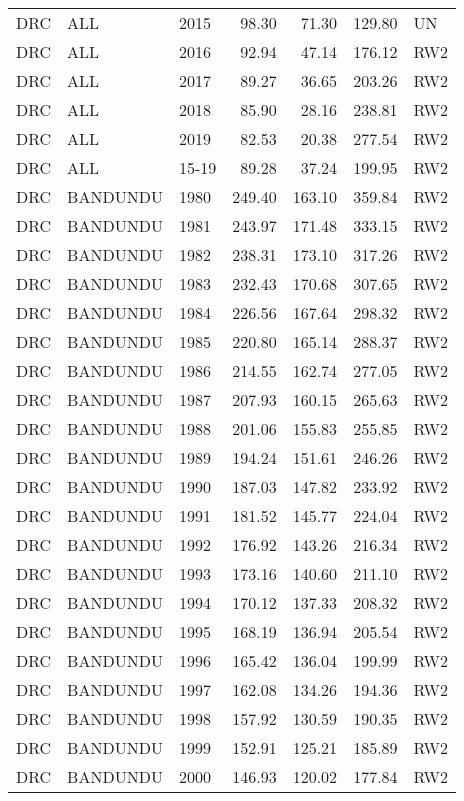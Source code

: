 \begin{longtable}{lllrrrl}
  DRC & ALL & 2015 & 98.30 & 71.30 & 129.80 & UN \\ 
  DRC & ALL & 2016 & 92.94 & 47.14 & 176.12 & RW2 \\ 
  DRC & ALL & 2017 & 89.27 & 36.65 & 203.26 & RW2 \\ 
  DRC & ALL & 2018 & 85.90 & 28.16 & 238.81 & RW2 \\ 
  DRC & ALL & 2019 & 82.53 & 20.38 & 277.54 & RW2 \\ 
  DRC & ALL & 15-19 & 89.28 & 37.24 & 199.95 & RW2 \\ 
  DRC & BANDUNDU & 1980 & 249.40 & 163.10 & 359.84 & RW2 \\ 
  DRC & BANDUNDU & 1981 & 243.97 & 171.48 & 333.15 & RW2 \\ 
  DRC & BANDUNDU & 1982 & 238.31 & 173.10 & 317.26 & RW2 \\ 
  DRC & BANDUNDU & 1983 & 232.43 & 170.68 & 307.65 & RW2 \\ 
  DRC & BANDUNDU & 1984 & 226.56 & 167.64 & 298.32 & RW2 \\ 
  DRC & BANDUNDU & 1985 & 220.80 & 165.14 & 288.37 & RW2 \\ 
  DRC & BANDUNDU & 1986 & 214.55 & 162.74 & 277.05 & RW2 \\ 
  DRC & BANDUNDU & 1987 & 207.93 & 160.15 & 265.63 & RW2 \\ 
  DRC & BANDUNDU & 1988 & 201.06 & 155.83 & 255.85 & RW2 \\ 
  DRC & BANDUNDU & 1989 & 194.24 & 151.61 & 246.26 & RW2 \\ 
  DRC & BANDUNDU & 1990 & 187.03 & 147.82 & 233.92 & RW2 \\ 
  DRC & BANDUNDU & 1991 & 181.52 & 145.77 & 224.04 & RW2 \\ 
  DRC & BANDUNDU & 1992 & 176.92 & 143.26 & 216.34 & RW2 \\ 
  DRC & BANDUNDU & 1993 & 173.16 & 140.60 & 211.10 & RW2 \\ 
  DRC & BANDUNDU & 1994 & 170.12 & 137.33 & 208.32 & RW2 \\ 
  DRC & BANDUNDU & 1995 & 168.19 & 136.94 & 205.54 & RW2 \\ 
  DRC & BANDUNDU & 1996 & 165.42 & 136.04 & 199.99 & RW2 \\ 
  DRC & BANDUNDU & 1997 & 162.08 & 134.26 & 194.36 & RW2 \\ 
  DRC & BANDUNDU & 1998 & 157.92 & 130.59 & 190.35 & RW2 \\ 
  DRC & BANDUNDU & 1999 & 152.91 & 125.21 & 185.89 & RW2 \\ 
  DRC & BANDUNDU & 2000 & 146.93 & 120.02 & 177.84 & RW2 \\ 

\end{longtable}
